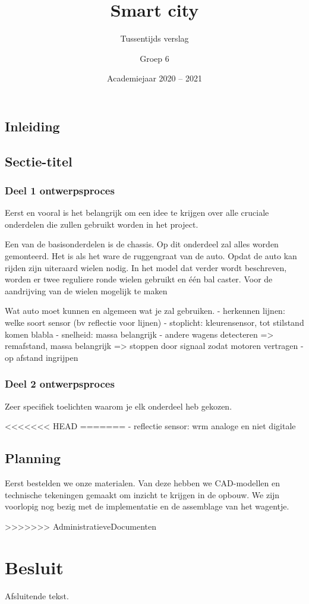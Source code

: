 \documentclass[a4paper,twoside,kulak]{kulakreport} %
\title{Smart city}
\subtitle{Tussentijds verslag}
\author{Groep 6}
\institute{KU Leuven Kulak, Wetenschap \& Technologie}
\date{Academiejaar 2020 -- 2021}
\begin{document}

\titlepage

\tableofcontents

\section*{Inleiding}

\section{Sectie-titel}

\subsection{Deel 1 ontwerpsproces}

Eerst en vooral is het belangrijk om een idee te krijgen over alle cruciale onderdelen die zullen gebruikt worden in het project. 

Een van de basisonderdelen is de chassis. Op dit onderdeel zal alles worden gemonteerd. Het is als het ware de ruggengraat van de auto. 
Opdat de auto kan rijden zijn uiteraard wielen nodig. In het model dat verder wordt beschreven, worden er twee reguliere ronde wielen gebruikt en één bal caster. Voor de aandrijving van de wielen mogelijk te maken  



Wat auto moet kunnen en algemeen wat je zal gebruiken.
- herkennen lijnen: welke soort sensor (bv reflectie voor lijnen)
- stoplicht: kleurensensor, tot stilstand komen blabla
- snelheid: massa belangrijk
- andere wagens detecteren => remafstand, massa belangrijk => stoppen door signaal zodat motoren vertragen
- op afstand ingrijpen

\subsection{Deel 2 ontwerpsproces}
Zeer specifiek toelichten waarom je elk onderdeel heb gekozen.

<<<<<<< HEAD
=======
- reflectie sensor: wrm analoge en niet digitale
\section{Planning}
Eerst bestelden we onze materialen. Van deze hebben we CAD-modellen en technische tekeningen gemaakt om inzicht te krijgen in de opbouw. We zijn voorlopig nog bezig met de implementatie en de assemblage van het wagentje.






>>>>>>> AdministratieveDocumenten
\chapter*{Besluit}
Afsluitende tekst.
\end{document}
